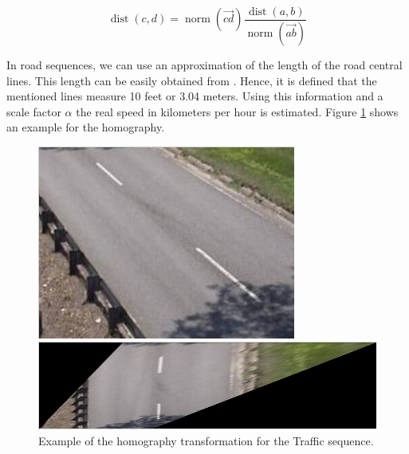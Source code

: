 \documentclass{article}
\begin{document}
\begin{equation}
\operatorname{dist}(c,d)=\operatorname{norm}(\vec{cd})\frac{\operatorname{dist}(a,b)}{\operatorname{norm}(\vec{ab})}
\end{equation}

In road sequences, we can use an approximation of the length of the road central lines. This length can be easily obtained from \cite{USfedguide}. Hence, it is defined that the mentioned lines measure 10 feet or 3.04 meters. Using this information and a scale factor \(\alpha\) the real speed in kilometers per hour is estimated. Figure \ref{fig:homo} shows an example for the homography.

\begin{figure}[htb]
\begin{minipage}[b]{.48\linewidth}
  \centering
  \centerline{\includegraphics[width=\textwidth]{fig/Traffic}}
  \medskip
\end{minipage}
\hfill
\begin{minipage}[b]{0.48\linewidth}
  \centering
  \centerline{\includegraphics[width=\textwidth]{fig/Traffic_h}}
\medskip
\end{minipage}
%
\caption{Example of the homography transformation for the Traffic sequence.}
\label{fig:homo}
%
\end{figure}
\end{document}
